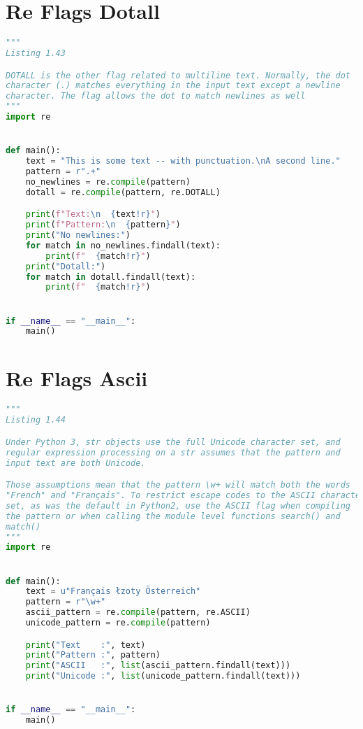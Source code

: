 \documentclass[a4paper,landscape]{report}
\begin{document}
\section{Re Flags Dotall}
\begin{lstlisting}[language=Python]
"""
Listing 1.43

DOTALL is the other flag related to multiline text. Normally, the dot
character (.) matches everything in the input text except a newline
character. The flag allows the dot to match newlines as well
"""
import re


def main():
    text = "This is some text -- with punctuation.\nA second line."
    pattern = r".+"
    no_newlines = re.compile(pattern)
    dotall = re.compile(pattern, re.DOTALL)

    print(f"Text:\n  {text!r}")
    print(f"Pattern:\n  {pattern}")
    print("No newlines:")
    for match in no_newlines.findall(text):
        print(f"  {match!r}")
    print("Dotall:")
    for match in dotall.findall(text):
        print(f"  {match!r}")


if __name__ == "__main__":
    main()

\end{lstlisting}
\section{Re Flags Ascii}
\begin{lstlisting}[language=Python]
"""
Listing 1.44

Under Python 3, str objects use the full Unicode character set, and
regular expression processing on a str assumes that the pattern and
input text are both Unicode.

Those assumptions mean that the pattern \w+ will match both the words
"French" and "Français". To restrict escape codes to the ASCII character
set, as was the default in Python2, use the ASCII flag when compiling
the pattern or when calling the module level functions search() and
match()
"""
import re


def main():
    text = u"Français łzoty Österreich"
    pattern = r"\w+"
    ascii_pattern = re.compile(pattern, re.ASCII)
    unicode_pattern = re.compile(pattern)

    print("Text    :", text)
    print("Pattern :", pattern)
    print("ASCII   :", list(ascii_pattern.findall(text)))
    print("Unicode :", list(unicode_pattern.findall(text)))


if __name__ == "__main__":
    main()

\end{lstlisting}
\end{document}

